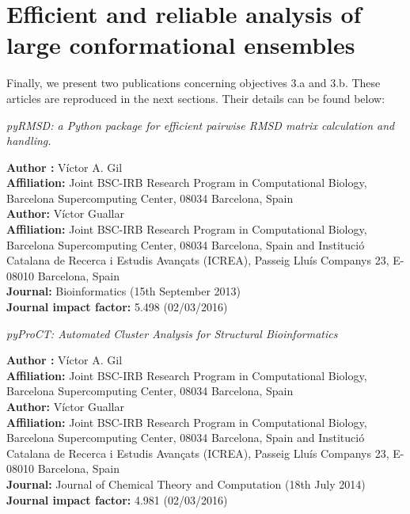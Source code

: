 \section[Efficient and reliable analysis]{Efficient and reliable analysis of large conformational ensembles}
Finally, we present two publications concerning objectives 3.a and 3.b. These articles are reproduced in the next sections. Their details can be found below:

\noindent
\parbox{\dimexpr\linewidth-2\fboxsep-2\fboxrule}{
\begin{center}
\textit{pyRMSD: a Python package for efficient pairwise RMSD matrix calculation and handling.}
\end{center}
\medskip
\textbf{Author :} V\'ictor A. Gil\\ 
\textbf{Affiliation:} Joint BSC-IRB Research Program in Computational Biology, Barcelona Supercomputing Center, 08034 Barcelona, Spain\\
\medskip
\textbf{Author:} V\'ictor Guallar\\
\textbf{Affiliation:} Joint BSC-IRB Research Program in Computational Biology, Barcelona Supercomputing Center, 08034 Barcelona, Spain and Instituci\'o Catalana de Recerca i Estudis Avan\c{c}ats (ICREA), Passeig Llu\'is Companys 23, E-08010 Barcelona, Spain\\
\medskip
\textbf{Journal:} Bioinformatics (15th September 2013)\\
\textbf{Journal impact factor:} 5.498 (02/03/2016)
}

\medskip

\noindent
\parbox{\dimexpr\linewidth-2\fboxsep-2\fboxrule}{
\begin{center}
\textit{pyProCT: Automated Cluster Analysis for Structural Bioinformatics}
\end{center}
\medskip
\textbf{Author :} V\'ictor A. Gil\\ 
\textbf{Affiliation:} Joint BSC-IRB Research Program in Computational Biology, Barcelona Supercomputing Center, 08034 Barcelona, Spain\\
\medskip
\textbf{Author:} V\'ictor Guallar\\
\textbf{Affiliation:} Joint BSC-IRB Research Program in Computational Biology, Barcelona Supercomputing Center, 08034 Barcelona, Spain and Instituci\'o Catalana de Recerca i Estudis Avan\c{c}ats (ICREA), Passeig Llu\'is Companys 23, E-08010 Barcelona, Spain\\
\medskip
\textbf{Journal:} Journal of Chemical Theory and Computation (18th July 2014)\\
\textbf{Journal impact factor:}  4.981 (02/03/2016) 
}
\medskip


